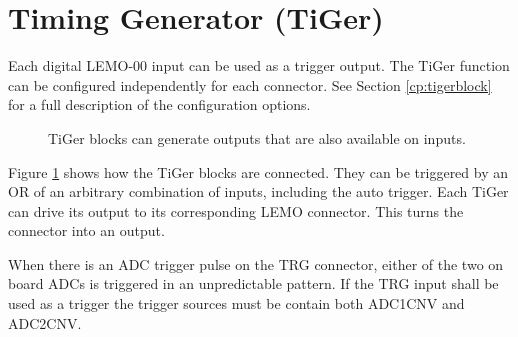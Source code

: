\section{Timing Generator (TiGer)\label{cp:tiger}}
Each digital LEMO-00 input can be used as a  trigger output. 
The TiGer function can be configured independently for each connector. 
See Section \ref{cp:tigerblock} for a full description of the configuration options.
% 
\begin{figure}[ht]
    \begin{center}
        \caption{TiGer blocks can generate outputs that are also available on inputs.\label{fig:matrix}} 
    \end{center}
\end{figure}
%

Figure \ref{fig:matrix} shows how the TiGer blocks are connected. They can be triggered by an OR of an arbitrary combination of inputs, 
including the auto trigger. Each TiGer can drive its output to its corresponding LEMO connector. This turns the connector into an output. 

When there is an ADC trigger pulse on the TRG connector, either of the two on board ADCs is triggered in an unpredictable pattern. 
If the TRG input shall be used as a trigger the trigger sources must be contain both \textsf{ADC1\tu CNV} and \textsf{ADC2\tu CNV}.

